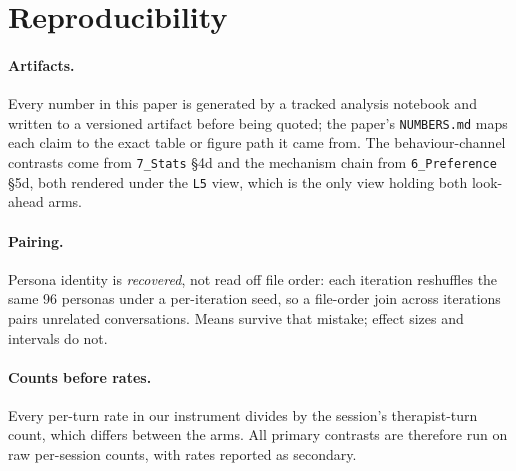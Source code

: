 \section{Reproducibility}
\label{app:repro}

\paragraph{Artifacts.} Every number in this paper is generated by a tracked analysis notebook and
written to a versioned artifact before being quoted; the paper's \texttt{NUMBERS.md} maps each
claim to the exact table or figure path it came from. The behaviour-channel contrasts come from
\texttt{7\_Stats} \S4d and the mechanism chain from \texttt{6\_Preference} \S5d, both rendered
under the \texttt{L5} view, which is the only view holding both look-ahead arms.

\paragraph{Pairing.} Persona identity is \emph{recovered}, not read off file order: each iteration
reshuffles the same 96 personas under a per-iteration seed, so a file-order join across iterations
pairs unrelated conversations. Means survive that mistake; effect sizes and intervals do not.

\paragraph{Counts before rates.} Every per-turn rate in our instrument divides by the session's
therapist-turn count, which differs between the arms. All primary contrasts are therefore run on
raw per-session counts, with rates reported as secondary. 
